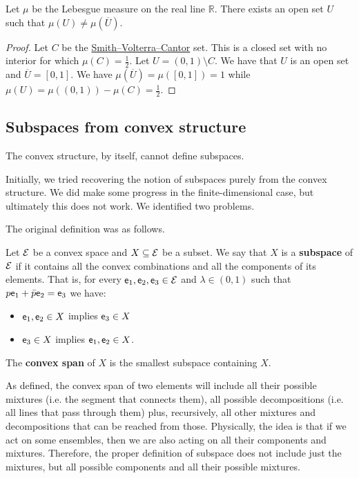 \begin{prop}
	Let $\mu$ be the Lebesgue measure on the real line $\mathbb{R}$. There exists an open set $U$ such that $\mu(U) \neq \mu(\overline{U})$.
\end{prop}

\begin{proof}
	Let $C$ be the \href{https://en.wikipedia.org/wiki/Smith%E2%80%93Volterra%E2%80%93Cantor_set}{Smith–Volterra–Cantor} set. This is a closed set with no interior for which $\mu(C) = \frac{1}{2}$. Let $U = (0,1) \setminus C$. We have that $U$ is an open set and $\overline{U} = [0,1]$. We have $\mu(\overline{U}) = \mu([0,1]) = 1$ while $\mu(U) = \mu((0,1)) - \mu(C) = \frac{1}{2}$.
\end{proof}

\subsection{Subspaces from convex structure}\label{pm-es-failureConvexSubspace}

\begin{insight}
	The convex structure, by itself, cannot define subspaces.
\end{insight}

Initially, we tried recovering the notion of subspaces purely from the convex structure. We did make some progress in the finite-dimensional case, but ultimately this does not work. We identified two problems.

The original definition was as follows.

\begin{defn}
	Let $\mathcal{E}$ be a convex space and $X \subseteq \mathcal{E}$ be a subset. We say that $X$ is a \textbf{subspace} of $\mathcal{E}$ if it contains all the convex combinations and all the components of its elements. That is, for every $\mathsf{e}_1, \mathsf{e}_2, \mathsf{e}_3 \in \mathcal{E}$ and $\lambda \in (0,1)$ such that $p \mathsf{e}_1 + \bar{p} \mathsf{e}_2 = \mathsf{e}_3$ we have:
	\begin{itemize}
		\item $\mathsf{e}_1, \mathsf{e}_2 \in X$ implies $\mathsf{e}_3 \in X$
		\item $\mathsf{e}_3 \in X$ implies $\mathsf{e}_1, \mathsf{e}_2 \in X$.
	\end{itemize}
	The \textbf{convex span} of $X$ is the smallest subspace containing $X$.
\end{defn}

\begin{remark}
	As defined, the convex span of two elements will include all their possible mixtures (i.e. the segment that connects them), all possible decompositions (i.e. all lines that pass through them) plus, recursively, all other mixtures and decompositions that can be reached from those. Physically, the idea is that if we act on some ensembles, then we are also acting on all their components and mixtures. Therefore, the proper definition of subspace does not include just the mixtures, but all possible components and all their possible mixtures.
\end{remark}

